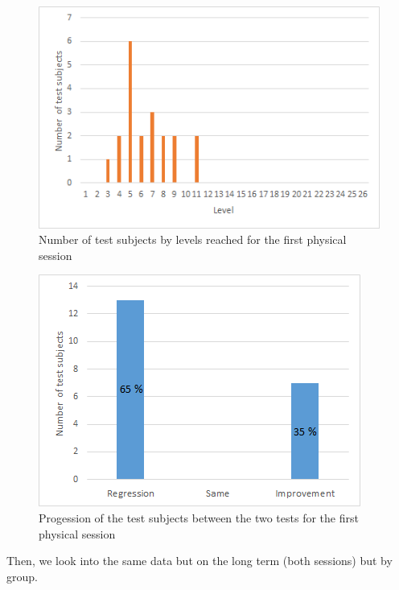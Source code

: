 \documentclass[12pt, openany, twocolumn]{article}
\begin{document}
        \begin{figure}
            \includegraphics[scale=0.74]{graphics/bargraph-p-nbtestsubjectperlevel2.png}
            \caption{Number of test subjects by levels reached for the first physical session}
        \end{figure}
        
        \begin{figure}
            \includegraphics[scale=0.74]{graphics/rsi-p.png}
            \caption{Progession of the test subjects between the two tests for the first physical session}
        \end{figure}
    
        

    Then, we look into the same data but on the long term (both sessions) but by group. \\
    

        \begin{figure}
            \caption{}
        \end{figure}
\end{document}
